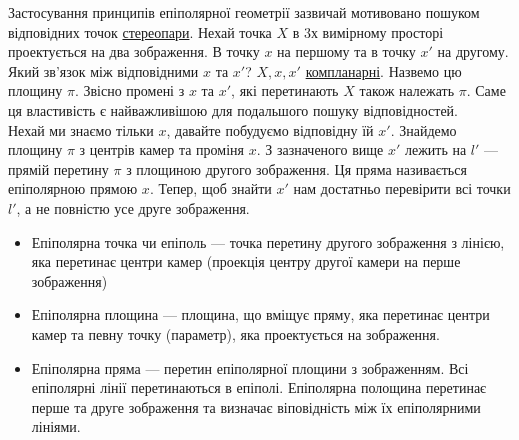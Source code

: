 Застосування принципів епіполярної геометрії зазвичай мотивовано пошуком
відповідних точок 
\href{https://uk.wikipedia.org/wiki/%D0%A1%D1%82%D0%B5%D1%80%D0%B5%D0%BE%D0%BF%D0%B0%D1%80%D0%B0}
{стереопари}. Нехай точка $X$ в 3х вимірному просторі проектується на два 
зображення. В точку $x$ на першому та в точку $x'$ на другому. Який зв'язок 
між відповідними $x$ та $x'$? $X, x, x'$ 
\href{https://en.wikipedia.org/wiki/Coplanarity}{компланарні}. Назвемо цю 
площину $\pi$. Звісно промені з $x$ та $x'$, які перетинають $X$ також належать
$\pi$. Саме ця властивість є найважливішою для подальшого пошуку відповідностей.
\\\indent
Нехай ми знаємо тільки $x$, давайте побудуємо відповідну їй $x'$. Знайдемо 
площину $\pi$ з центрів камер та проміня $x$. З зазначеного вище $x'$ лежить на 
$l'$ --- прямій перетину $\pi$ з площиною другого зображення. Ця пряма 
називається епіполярною прямою $x$. Тепер, щоб знайти $x'$ нам достатньо 
перевірити всі точки $l'$, а не повністю усе друге зображення.
\begin{itemize}
	\item{Епіполярна точка чи епіполь --- точка перетину другого зображення
з лінією, яка перетинає центри камер (проекція центру другої камери на перше 
зображення)}
    \item{Епіполярна площина --- площина, що вміщує пряму, яка перетинає центри 
камер та певну точку (параметр), яка проектується на зображення.}
    \item{Епіполярна пряма --- перетин епіполярної площини з зображенням. Всі
епіполярні лінії перетинаються в епіполі. Епіполярна полощина перетинає перше 
та друге зображення та визначає віповідність між їх епіполярними лініями.}
\end{itemize}

